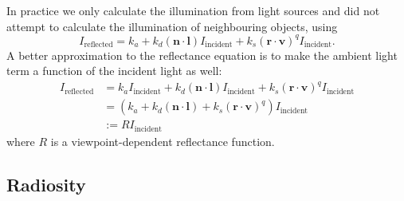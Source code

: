 \documentclass[twocolumn,landscape,10pt]{article}
\theoremstyle{definition}
\begin{document}
In practice we only calculate the illumination from light sources and 
did not attempt to calculate the illumination of neighbouring objects, using
\[
    I_\text{reflected}
    = k_a+k_d(\mathbf{n}\cdot\mathbf{l})I_\text{incident}
    +k_s{(\mathbf{r}\cdot\mathbf{v})}^{q}I_\text{incident}.
\]
A better approximation to the reflectance equation is to make the ambient light
term a function of the incident light as well:
\begin{align*}
    I_\text{reflected}
    & = k_aI_\text{incident}+k_d(\mathbf{n}\cdot\mathbf{l})I_\text{incident}
    +k_s{(\mathbf{r}\cdot\mathbf{v})}^{q}I_\text{incident} \\
    & = (k_a +
    k_d(\mathbf{n}\cdot\mathbf{l})+k_s{(\mathbf{r}\cdot\mathbf{v})}^{q})I_\text{incident} \\
    & := RI_\text{incident}
\end{align*} 
where $R$ is a viewpoint-dependent reflectance function.


\subsection{Radiosity}
\end{document}
